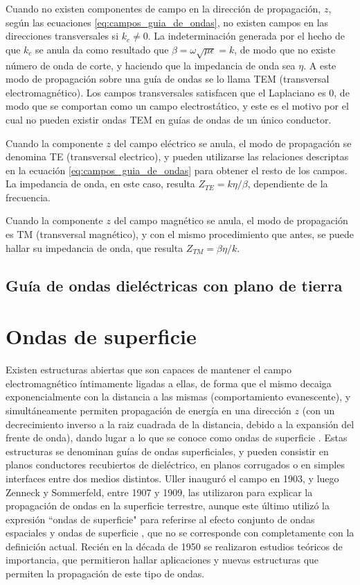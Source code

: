 Cuando no existen componentes de campo en la dirección de propagación, $z$, según las ecuaciones \ref{eq:campos_guia_de_ondas}, no existen campos en las direcciones transversales si $k_c \neq 0$. La indeterminación generada por el hecho de que $k_c$ se anula da como resultado que $\beta = \omega \sqrt{\mu \epsilon} = k$, de modo que no existe número de onda de corte, y haciendo que la impedancia de onda sea $\eta$.  A este modo de propagación sobre una guía de ondas se lo llama TEM (transversal electromagnético). Los campos transversales satisfacen que el Laplaciano es 0, de modo que se comportan como un campo electrostático, y este es el motivo por el cual no pueden existir ondas TEM en guías de ondas de un único conductor.

Cuando la componente $z$ del campo eléctrico se anula, el modo de propagación se denomina TE (transversal electrico), y pueden utilizarse las relaciones descriptas en la ecuación \ref{eq:campos_guia_de_ondas} para obtener el resto de los campos. La impedancia de onda, en este caso, resulta $Z_{TE} = k\eta/\beta$, dependiente de la frecuencia.

Cuando la componente $z$ del campo magnético se anula, el modo de propagación es TM (transversal magnético), y con el mismo procedimiento que antes, se puede hallar su impedancia de onda, que resulta $Z_{TM} = \beta \eta / k$.

\subsection{Guía de ondas dieléctricas con plano de tierra}

\section{Ondas de superficie}

Existen estructuras abiertas que son capaces de mantener el campo electromagnético íntimamente ligadas a ellas, de forma que el mismo decaiga exponencialmente con la distancia a las mismas (comportamiento evanescente), y simultáneamente permiten propagación de energía en una dirección $z$ (con un decrecimiento inverso a la raiz cuadrada de la distancia, debido a la expansión del frente de onda), dando lugar a lo que se conoce como ondas de superficie \cite{Barlow:SurfaceWaves}. Estas estructuras se denominan guías de ondas superficiales, y pueden consistir en planos conductores recubiertos de dieléctrico, en planos corrugados o en simples interfaces entre dos medios distintos. Uller inauguró el campo en 1903, y luego Zenneck y Sommerfeld, entre 1907 y 1909, las utilizaron para explicar la propagación de ondas en la superficie terrestre, aunque este último utilizó la expresión ``ondas de superficie" para referirse al efecto conjunto de ondas espaciales y ondas de superficie \cite{Barlow:SurfaceWaves}, que no se corresponde con completamente con la definición actual. Recién en la década de 1950 se realizaron estudios teóricos de importancia, que permitieron hallar aplicaciones y nuevas estructuras que permiten la propagación de este tipo de ondas.

